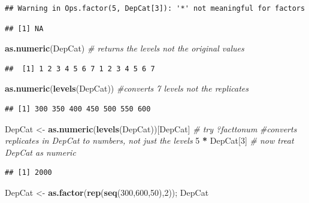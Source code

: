 \documentclass[
  lang=cn,
  11pt,
  scheme=chinese,
  chinesefont=nofont,
  citestyle=gb7714-2015,
  bibstyle=gb7714-2015]{elegantbook}
\newenvironment{Shaded}{\begin{snugshade}}{\end{snugshade}}
\newcommand{\CommentTok}[1]{\textcolor[rgb]{0.56,0.35,0.01}{\textit{#1}}}
\newcommand{\DecValTok}[1]{\textcolor[rgb]{0.00,0.00,0.81}{#1}}
\newcommand{\FunctionTok}[1]{\textcolor[rgb]{0.13,0.29,0.53}{\textbf{#1}}}
\newcommand{\NormalTok}[1]{#1}
\newcommand{\OtherTok}[1]{\textcolor[rgb]{0.56,0.35,0.01}{#1}}
\newcommand{\SpecialCharTok}[1]{\textcolor[rgb]{0.81,0.36,0.00}{\textbf{#1}}}
\begin{document}
\begin{verbatim}
## Warning in Ops.factor(5, DepCat[3]): '*' not meaningful for factors
\end{verbatim}

\begin{verbatim}
## [1] NA
\end{verbatim}

\begin{Shaded}
\begin{Highlighting}[]
\FunctionTok{as.numeric}\NormalTok{(DepCat) }\CommentTok{\# returns the levels not the original values  }
\end{Highlighting}
\end{Shaded}

\begin{verbatim}
##  [1] 1 2 3 4 5 6 7 1 2 3 4 5 6 7
\end{verbatim}

\begin{Shaded}
\begin{Highlighting}[]
\FunctionTok{as.numeric}\NormalTok{(}\FunctionTok{levels}\NormalTok{(DepCat)) }\CommentTok{\#converts 7 levels not the replicates  }
\end{Highlighting}
\end{Shaded}

\begin{verbatim}
## [1] 300 350 400 450 500 550 600
\end{verbatim}

\begin{Shaded}
\begin{Highlighting}[]
\NormalTok{DepCat }\OtherTok{\textless{}{-}} \FunctionTok{as.numeric}\NormalTok{(}\FunctionTok{levels}\NormalTok{(DepCat))[DepCat] }\CommentTok{\# try ?facttonum  }
 \CommentTok{\#converts replicates in DepCat to numbers, not just the levels   }
\DecValTok{5} \SpecialCharTok{*}\NormalTok{ DepCat[}\DecValTok{3}\NormalTok{]   }\CommentTok{\# now treat DepCat as numeric  }
\end{Highlighting}
\end{Shaded}

\begin{verbatim}
## [1] 2000
\end{verbatim}

\begin{Shaded}
\begin{Highlighting}[]
\NormalTok{DepCat }\OtherTok{\textless{}{-}} \FunctionTok{as.factor}\NormalTok{(}\FunctionTok{rep}\NormalTok{(}\FunctionTok{seq}\NormalTok{(}\DecValTok{300}\NormalTok{,}\DecValTok{600}\NormalTok{,}\DecValTok{50}\NormalTok{),}\DecValTok{2}\NormalTok{)); DepCat  }
\end{Highlighting}
\end{Shaded}
\end{document}

